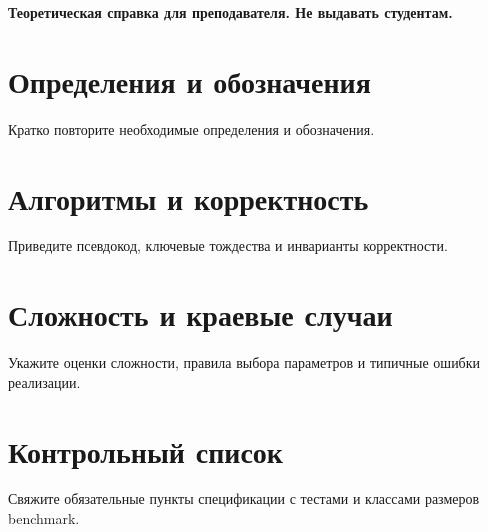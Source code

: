 \documentclass[12pt]{ca-capstone}
\begin{document}

\begin{center}
  \textbf{Теоретическая справка для преподавателя. Не выдавать студентам.}
\end{center}

\section{Определения и обозначения}
Кратко повторите необходимые определения и обозначения.

\section{Алгоритмы и корректность}
Приведите псевдокод, ключевые тождества и инварианты корректности.

\section{Сложность и краевые случаи}
Укажите оценки сложности, правила выбора параметров и типичные ошибки реализации.

\clearpage
\section{Контрольный список}
Свяжите обязательные пункты спецификации с тестами и классами размеров benchmark.

\end{document}
